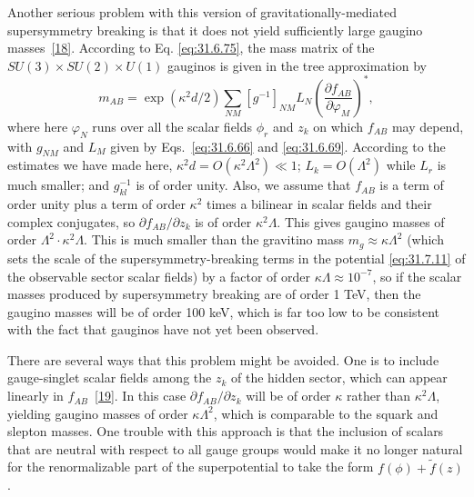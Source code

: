 Another serious problem with this version of gravitationally-mediated
supersymmetry breaking is that it does not yield sufficiently large gaugino
masses~\hyperref[ch31-ref-18]{[18]}. According to Eq.
\eqref{eq:31.6.75}, the mass matrix of the
\(SU(3)\times SU(2)\times U(1)\) gauginos is given in the tree approximation
by
\begin{equation}
  m_{AB}
  =\exp(\kappa^2d/2)\sum_{NM}[g^{-1}]_{NM}L_N
    \left(\frac{\partial f_{AB}}{\partial\varphi_M}\right)^*,
  \tag{31.7.13}\label{eq:31.7.13}
\end{equation}
where here \(\varphi_N\) runs over all the scalar fields \(\phi_r\) and
\(z_k\) on which \(f_{AB}\) may depend, with \(g_{NM}\) and \(L_M\) given by
Eqs.~\eqref{eq:31.6.66} and \eqref{eq:31.6.69}. According to the estimates
we have made here, \(\kappa^2d=O(\kappa^2\Lambda^2)\ll1\);
\(L_k=O(\Lambda^2)\) while \(L_r\) is much smaller; and \(g_{kl}^{-1}\) is
of order unity. Also, we assume that
\(f_{AB}\) is a term of order unity plus a term of order \(\kappa^2\) times
a bilinear in scalar fields and their complex conjugates, so
\(\partial f_{AB}/\partial z_k\) is of order \(\kappa^2\Lambda\). This gives
gaugino masses of order \(\Lambda^2\cdot\kappa^2\Lambda\). This is much
smaller than the gravitino mass \(m_g\approx\kappa\Lambda^2\) (which sets
the scale of the supersymmetry-breaking terms in the potential
\eqref{eq:31.7.11} of the observable sector scalar fields) by a factor of
order \(\kappa\Lambda\approx10^{-7}\), so if the scalar masses produced by
supersymmetry breaking are of order 1 TeV, then the gaugino masses will be
of order 100 keV, which is far too low to be consistent with the fact that
gauginos have not yet been observed.

There are several ways that this problem might be avoided. One is to include
gauge-singlet scalar fields among the \(z_k\) of the hidden sector, which can
appear linearly in \(f_{AB}\)~\hyperref[ch31-ref-19]{[19]}. In this case
\(\partial f_{AB}/\partial z_k\) will be of order \(\kappa\) rather than
\(\kappa^2\Lambda\), yielding gaugino masses of order
\(\kappa\Lambda^2\), which is comparable to the squark and slepton masses.
One trouble with this approach is that the inclusion of scalars that are
neutral with respect to all gauge groups would make it no longer natural for
the renormalizable part of the superpotential to take the form
\(f(\phi)+\widetilde f(z)\).


